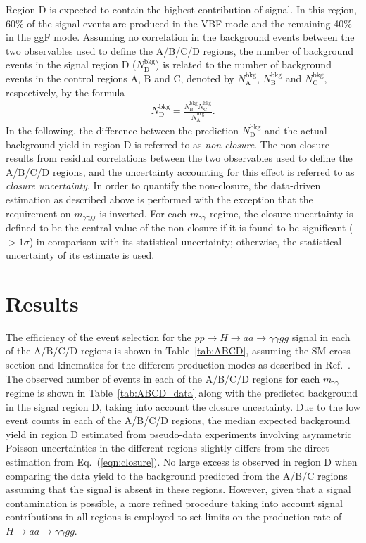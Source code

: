 Region D is expected to contain the highest contribution of signal. 
In this region, 60\% of the signal events are produced in the VBF mode and the remaining 40\% in the ggF mode.
Assuming no correlation in the background events between the two observables used to define the A/B/C/D regions,
the number of background events in the signal region D ($N^\text{bkg}_\text{D}$) is related to the number
of background events in the control regions A, B and C, denoted by $N^\text{bkg}_\text{A}$, $N^\text{bkg}_\text{B}$
and $N^\text{bkg}_\text{C}$, respectively, by the formula
\begin{align}
N^\text{bkg}_\text{D} = \frac{N^\text{bkg}_\text{B}N^\text{bkg}_\text{C}}{N^\text{bkg}_\text{A}}.
\label{eqn:closure}
\end{align}
In the following, the difference between the prediction $N^\text{bkg}_\text{D}$ and the actual background yield in region D 
is referred to as \textit{non-closure}.
The non-closure results from residual correlations between the two observables used to define the A/B/C/D regions,
and the uncertainty accounting for this effect is referred to as \textit{closure uncertainty}.
In order to quantify the non-closure, the data-driven estimation as described above is performed 
with the exception that the requirement on $m_{\gamma\gamma jj}$ is inverted.
For each $m_{\gamma\gamma}$ regime,
the closure uncertainty is defined to be 
the central value of the non-closure if it is found to be significant ($>1\sigma$) in comparison with its statistical uncertainty; 
otherwise, the statistical uncertainty of its estimate is used.

\section{Results}

The efficiency of the event selection for the $pp\to H\to aa \to \gamma\gamma gg$ signal in each of the A/B/C/D regions is shown in Table~\ref{tab:ABCD},
assuming the SM cross-section and kinematics for the different production modes as described in Ref.~\cite{deFlorian:2016spz}.
The observed number of events in each of the A/B/C/D regions for each $m_{\gamma\gamma}$ regime is shown in Table~\ref{tab:ABCD_data}
along with the predicted background in the signal region D, taking into account the closure uncertainty. 
Due to the low event counts in each of the A/B/C/D regions,
the median expected background yield in region D estimated from pseudo-data experiments involving asymmetric Poisson uncertainties 
in the different regions slightly differs from the direct estimation from Eq.~(\ref{eqn:closure}).
No large excess is observed in region D when comparing the data yield to the background predicted from the A/B/C regions
assuming that the signal is absent in these regions.
However, given that a signal contamination is possible, a more refined procedure
taking into account signal contributions in all regions
is employed to set limits on the production rate of $H\to aa \to \gamma\gamma gg$.

